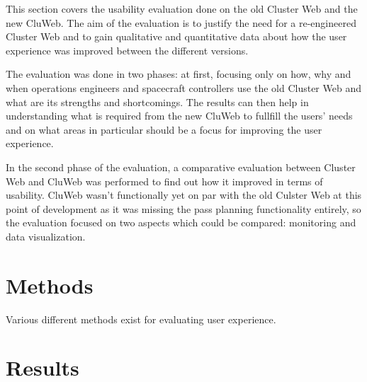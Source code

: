 
This section covers the usability evaluation done on the old Cluster Web and the new CluWeb. The aim of the evaluation is to justify the need for a re-engineered Cluster Web and to gain qualitative and quantitative data about how the user experience was improved between the different versions.

The evaluation was done in two phases: at first, focusing only on how, why and when operations engineers and spacecraft controllers use the old Cluster Web and what are its strengths and shortcomings. The results can then help in understanding what is required from the new CluWeb to fullfill the users' needs and on what areas in particular should be a focus for improving the user experience.

In the second phase of the evaluation, a comparative evaluation between Cluster Web and CluWeb was performed to find out how it improved in terms of usability. CluWeb wasn't functionally yet on par with the old Culster Web at this point of development as it was missing the pass planning functionality entirely, so the evaluation focused on two aspects which could be compared: monitoring and data visualization.

\section{Methods}

Various different methods exist for evaluating user experience.

\section{Results}
